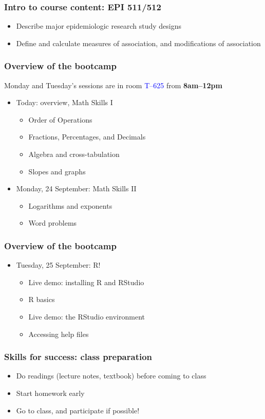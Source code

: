 \documentclass[12pt]{beamer}
\newcommand{\myframe}[1]{\begin{frame} \frametitle{#1}}
\newenvironment{spaceitemize}
{ \begin{itemize}
    \setlength{\itemsep}{10pt}
    \setlength{\parskip}{0pt}
    \setlength{\parsep}{0pt}     }
{ \end{itemize}                  }
\begin{document}
\myframe{Intro to course content: EPI 511/512}
\begin{spaceitemize}
\item Describe major epidemiologic research study designs
\item Define and calculate measures of association, and modifications of association
\end{spaceitemize}
\end{frame}

\myframe{Overview of the bootcamp}
Monday and Tuesday's sessions are in room \textcolor{blue}{T--625} from \textbf{8am--12pm}
\begin{spaceitemize}
\item Today: overview, Math Skills I
\begin{spaceitemize}
\item Order of Operations
\item Fractions, Percentages, and Decimals
\item Algebra and cross-tabulation
\item Slopes and graphs
\end{spaceitemize}
\item Monday, 24 September: Math Skills II
\begin{spaceitemize}
\item Logarithms and exponents
\item Word problems
\end{spaceitemize}
\end{spaceitemize}
\end{frame}

\myframe{Overview of the bootcamp}
\begin{spaceitemize}
\item Tuesday, 25 September: R! 
\begin{spaceitemize}
\item Live demo: installing R and RStudio
\item R basics
\item Live demo: the RStudio environment
\item Accessing help files
\end{spaceitemize}
\end{spaceitemize}
\end{frame}

\myframe{Skills for success: class preparation}
\begin{spaceitemize}
\item Do readings (lecture notes, textbook) before coming to class
\item Start homework early
\item Go to class, and participate if possible!
\end{spaceitemize}
\end{frame}
\end{document}
